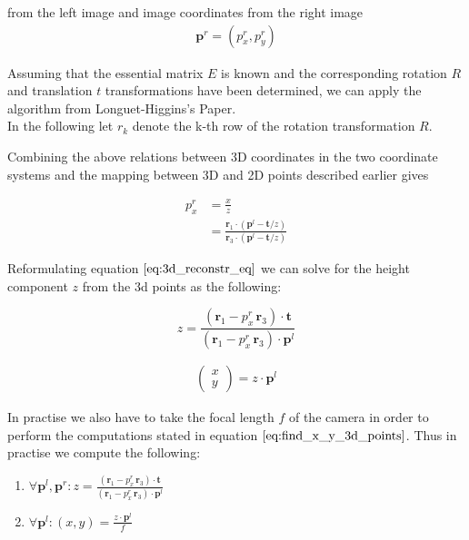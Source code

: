 \documentclass{paper}
\begin{document}
from the left image and image coordinates from the right image
\begin{align}
    \textbf{p}^{r} = (p^{r}_{x}, p^{r}_{y})
\end{align}

Assuming that the essential matrix $E$ is known and the corresponding rotation $R$ and translation $t$ transformations have been determined, we can apply the algorithm from Longuet-Higgins's Paper. \\

In the following let $r_k$ denote the k-th row of the rotation transformation $R$.



Combining the above relations between 3D coordinates in the two coordinate systems and the mapping between 3D and 2D points described earlier gives

\begin{align}
    p^{r}_{x} 
    &= \frac{x}{z} \\
    &= \frac{\mathbf{r}_{1} \cdot (\textbf{p}^{l} - \mathbf{t}/z)}{\mathbf{r}_{3} \cdot (\textbf{p}^{l} - \mathbf{t}/z)}  
\end{align}


Reformulating equation $\ref{eq:3d_reconstr_eq}$ we can solve for the height component $z$ from the 3d points as the following:

\begin{equation}
    z =  \frac{ (\mathbf{r}_{1} - p^{r}_{x} \, \mathbf{r}_{3}) \cdot \mathbf{t} }{ (\mathbf{r}_{1} - p^{r}_{x} \, \mathbf{r}_{3}) \cdot \textbf{p}^{l} }
\end{equation}


\begin{align}
\begin{pmatrix} x \\ y \end{pmatrix} = z \cdot \textbf{p}^{l}
\label{eq:find_x_y_3d_points}
\end{align}


In practise we also have to take the focal length $f$ of the camera in order to perform the computations stated in equation $\ref{eq:find_x_y_3d_points}$. Thus in practise we compute the following:

\begin{enumerate}
    \item $\forall \textbf{p}^{l}, \textbf{p}^{r}: z = \frac{ (\mathbf{r}_{1} - p^{r}_{x} \, \mathbf{r}_{3}) \cdot \mathbf{t} }{ (\mathbf{r}_{1} - p^{r}_{x} \, \mathbf{r}_{3}) \cdot \textbf{p}^{l} }$
    \item $\forall \textbf{p}^{l}: (x,y) = \frac{z \cdot \textbf{p}^{l}}{f}$
\end{enumerate}
\end{document}
